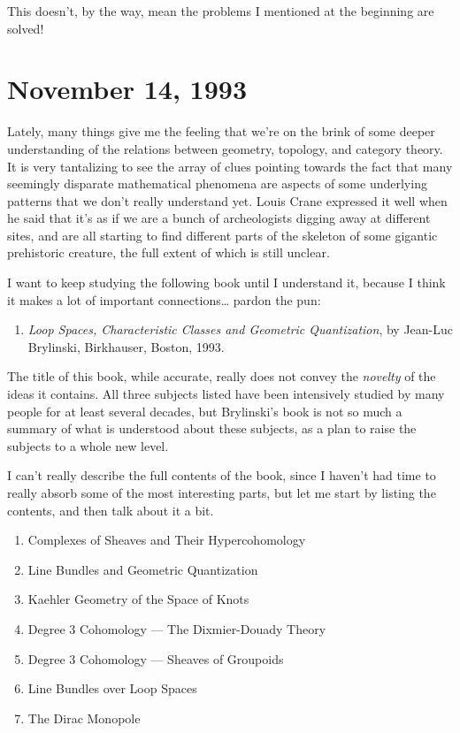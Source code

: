 \documentclass{article}
\def\tightlist{}
\begin{document}
This doesn't, by the way, mean the problems I mentioned at the beginning
are solved!
\hypertarget{week25}{%
\section{November 14, 1993}\label{week25}}

Lately, many things give me the feeling that we're on the brink of some
deeper understanding of the relations between geometry, topology, and
category theory. It is very tantalizing to see the array of clues
pointing towards the fact that many seemingly disparate mathematical
phenomena are aspects of some underlying patterns that we don't really
understand yet. Louis Crane expressed it well when he said that it's as
if we are a bunch of archeologists digging away at different sites, and
are all starting to find different parts of the skeleton of some
gigantic prehistoric creature, the full extent of which is still
unclear.

I want to keep studying the following book until I understand it,
because I think it makes a lot of important connections\ldots{} pardon
the pun:

\begin{enumerate}
\def\labelenumi{\arabic{enumi})}
\tightlist
\item
  \emph{Loop Spaces, Characteristic Classes and Geometric Quantization},
  by Jean-Luc Brylinski, Birkhauser, Boston, 1993.
\end{enumerate}

The title of this book, while accurate, really does not convey the
\emph{novelty} of the ideas it contains. All three subjects listed have
been intensively studied by many people for at least several decades,
but Brylinski's book is not so much a summary of what is understood
about these subjects, as a plan to raise the subjects to a whole new
level.

I can't really describe the full contents of the book, since I haven't
had time to really absorb some of the most interesting parts, but let me
start by listing the contents, and then talk about it a bit.

\begin{enumerate}
\def\labelenumi{\arabic{enumi}.}
\tightlist
\item
  Complexes of Sheaves and Their Hypercohomology
\item
  Line Bundles and Geometric Quantization
\item
  Kaehler Geometry of the Space of Knots
\item
  Degree 3 Cohomology --- The Dixmier-Douady Theory
\item
  Degree 3 Cohomology --- Sheaves of Groupoids
\item
  Line Bundles over Loop Spaces
\item
  The Dirac Monopole
\end{enumerate}
\end{document}

